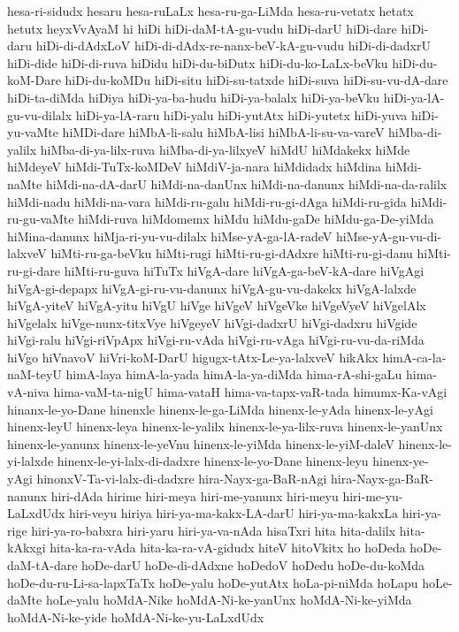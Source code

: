 {hesa-ri-sidudx
hesaru
hesa-ruLaLx
hesa-ru-ga-LiMda
hesa-ru-vetatx
hetatx
hetutx
heyxVvAyaM
hi
hiDi
hiDi-daM-tA-gu-vudu
hiDi-darU
hiDi-dare
hiDi-daru
hiDi-di-dAdxLoV
hiDi-di-dAdx-re-nanx-beV-kA-gu-vudu
hiDi-di-dadxrU
hiDi-dide
hiDi-di-ruva
hiDidu
hiDi-du-biDutx
hiDi-du-ko-LaLx-beVku
hiDi-du-koM-Dare
hiDi-du-koMDu
hiDi-situ
hiDi-su-tatxde
hiDi-suva
hiDi-su-vu-dA-dare
hiDi-ta-diMda
hiDiya
hiDi-ya-ba-hudu
hiDi-ya-balalx
hiDi-ya-beVku
hiDi-ya-lA-gu-vu-dilalx
hiDi-ya-lA-raru
hiDi-yalu
hiDi-yutAtx
hiDi-yutetx
hiDi-yuva
hiDi-yu-vaMte
hiMDi-dare
hiMbA-li-salu
hiMbA-lisi
hiMbA-li-su-va-vareV
hiMba-di-yalilx
hiMba-di-ya-lilx-ruva
hiMba-di-ya-lilxyeV
hiMdU
hiMdakekx
hiMde
hiMdeyeV
hiMdi-TuTx-koMDeV
hiMdiV-ja-nara
hiMdidadx
hiMdina
hiMdi-naMte
hiMdi-na-dA-darU
hiMdi-na-danUnx
hiMdi-na-danunx
hiMdi-na-da-ralilx
hiMdi-nadu
hiMdi-na-vara
hiMdi-ru-galu
hiMdi-ru-gi-dAga
hiMdi-ru-gida
hiMdi-ru-gu-vaMte
hiMdi-ruva
hiMdomemx
hiMdu
hiMdu-gaDe
hiMdu-ga-De-yiMda
hiMina-danunx
hiMja-ri-yu-vu-dilalx
hiMse-yA-ga-lA-radeV
hiMse-yA-gu-vu-di-lalxveV
hiMti-ru-ga-beVku
hiMti-rugi
hiMti-ru-gi-dAdxre
hiMti-ru-gi-danu
hiMti-ru-gi-dare
hiMti-ru-guva
hiTuTx
hiVgA-dare
hiVgA-ga-beV-kA-dare
hiVgAgi
hiVgA-gi-depapx
hiVgA-gi-ru-vu-danunx
hiVgA-gu-vu-dakekx
hiVgA-lalxde
hiVgA-yiteV
hiVgA-yitu
hiVgU
hiVge
hiVgeV
hiVgeVke
hiVgeVyeV
hiVgelAlx
hiVgelalx
hiVge-nunx-titxVye
hiVgeyeV
hiVgi-dadxrU
hiVgi-dadxru
hiVgide
hiVgi-ralu
hiVgi-riVpApx
hiVgi-ru-vAda
hiVgi-ru-vAga
hiVgi-ru-vu-da-riMda
hiVgo
hiVnavoV
hiVri-koM-DarU
higugx-tAtx-Le-ya-lalxveV
hikAkx‌
himA-ca-la-naM-teyU
himA-laya
himA-la-yada
himA-la-ya-diMda
hima-rA-shi-gaLu
hima-vA-niva
hima-vaM-ta-nigU
hima-vataH
hima-va-tapx-vaR-tada
himumx-Ka-vAgi
hinanx-le-yo-Dane
hinenxle
hinenx-le-ga-LiMda
hinenx-le-yAda
hinenx-le-yAgi
hinenx-leyU
hinenx-leya
hinenx-le-yalilx
hinenx-le-ya-lilx-ruva
hinenx-le-yanUnx
hinenx-le-yanunx
hinenx-le-yeVnu
hinenx-le-yiMda
hinenx-le-yiM-daleV
hinenx-le-yi-lalxde
hinenx-le-yi-lalx-di-dadxre
hinenx-le-yo-Dane
hinenx-leyu
hinenx-ye-yAgi
hinonxV-Ta-vi-lalx-di-dadxre
hira-Nayx-ga-BaR-nAgi
hira-Nayx-ga-BaR-nanunx
hiri-dAda
hirime
hiri-meya
hiri-me-yanunx
hiri-meyu
hiri-me-yu-LaLxdUdx
hiri-veyu
hiriya
hiri-ya-ma-kakx-LA-darU
hiri-ya-ma-kakxLa
hiri-ya-rige
hiri-ya-ro-babxra
hiri-yaru
hiri-ya-va-nAda
hisaTxri
hita
hita-dalilx
hita-kAkxgi
hita-ka-ra-vAda
hita-ka-ra-vA-gidudx
hiteV
hitoVkitx
ho
hoDeda
hoDe-daM-tA-dare
hoDe-darU
hoDe-di-dAdxne
hoDedoV
hoDedu
hoDe-du-koMda
hoDe-du-ru-Li-sa-lapxTaTx
hoDe-yalu
hoDe-yutAtx
hoLa-pi-niMda
hoLapu
hoLe-daMte
hoLe-yalu
hoMdA-Nike
hoMdA-Ni-ke-yanUnx
hoMdA-Ni-ke-yiMda
hoMdA-Ni-ke-yide
hoMdA-Ni-ke-yu-LaLxdUdx
}
